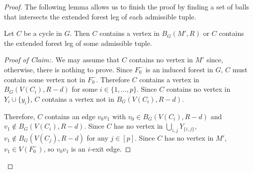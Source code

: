 \documentclass{patmorin}
\newcommand{\pat}[1]{\textcolor{Blue}{Pat: #1}}
\newcommand{\piotr}[1]{\textcolor{red}{Piotr: #1}}
\newenvironment{clmproof}{\begin{proof}[Proof of Claim:]\renewcommand{\qedsymbol}{\rule{1ex}{1ex}}}{\end{proof}}
\begin{document}
\begin{proof}

The following lemma allows us to finish the proof by finding a set of balls that intersects the extended forest leg of each admissible tuple.

\begin{clm}\label{hit_cycle}
  Let $C$ be a cycle in $G$.  Then  $C$ contains a vertex in $B_G(M',R)$ or $C$ contains the extended forest leg of some admissible tuple.
\end{clm}

\begin{clmproof}
  We may assume that $C$ contains no vertex in $M'$ since, otherwise, there is nothing to prove.
  Since $F_0^-$ is an induced forest in $G$, $C$ must contain some vertex not in $F_0^-$.  
  Therefore $C$ contains a vertex in $B_G(V(C_i),R-d)$  for some $i\in\{1,\ldots,p\}$. 
  Since $C$ contains no vertex in $Y_i\cup\{y_i\}$, $C$ contains a vertex not in $B_G(V(C_i),R-d)$.

  Therefore, $C$ contains an edge $v_0v_1$ with $v_0\in B_G(V(C_i),R-d)$ and $v_1\not\in B_G(V(C_i),R-d)$.  Since $C$ has no vertex in $\bigcup_{i,j}Y_{\{i,j\}}$, $v_1\not\in B_G(V(C_j),R-d)$ for any $j\in[p]$. Since $C$ has no vertex in $M'$, $v_1\in V(F^-_0)$, so $v_0v_1$ is an $i$-exit edge.
  


\end{clmproof}
\end{proof}
\end{document}
